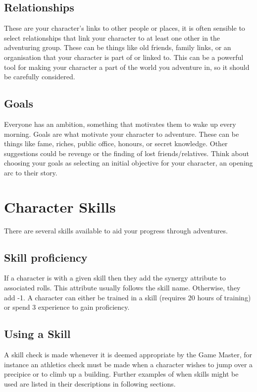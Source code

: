 \documentclass[a4paper,10pt,oneside]{book}
\newcommand{\textlf}[1]{\textbf{\titlecap{#1}}}
\begin{document}
\section{Relationships}
\label{sec:relationships}
These are your character's links to other people or places, it is often sensible to select relationships that link your character to at least one other in the adventuring group. These can be things like old friends, family links, or an organisation that your character is part of or linked to. This can be a powerful tool for making your character a part of the world you adventure in, so it should be carefully considered.


\section{Goals}
\label{sec:goals}
Everyone has an ambition, something that motivates them to wake up every morning. Goals are what motivate your character to adventure. These can be things like fame, riches, public office, honours, or secret knowledge. Other suggestions could be revenge or the finding of lost friends/relatives. Think about choosing your goals as selecting an initial objective for your character, an opening arc to their story.




\chapter{Character Skills}
\label{chap:skills}
There are several skills available to aid your progress through adventures.

\section{Skill proficiency}
\label{sec:skill-prof}
If a character is \textlf{proficient} with a given skill then they add the synergy attribute to associated rolls. This attribute usually follows the skill name. Otherwise, they add -1. A character can either be trained in a skill (requires 20 hours of training) or spend 3 experience to gain proficiency.


\section{Using a Skill}
\label{sec:use-skill}
A skill check is made whenever it is deemed appropriate by the Game Master, for instance an athletics check must be made when a character wishes to jump over a precipice or to climb up a building. Further examples of when skills might be used are listed in their descriptions in following sections.
\end{document}
